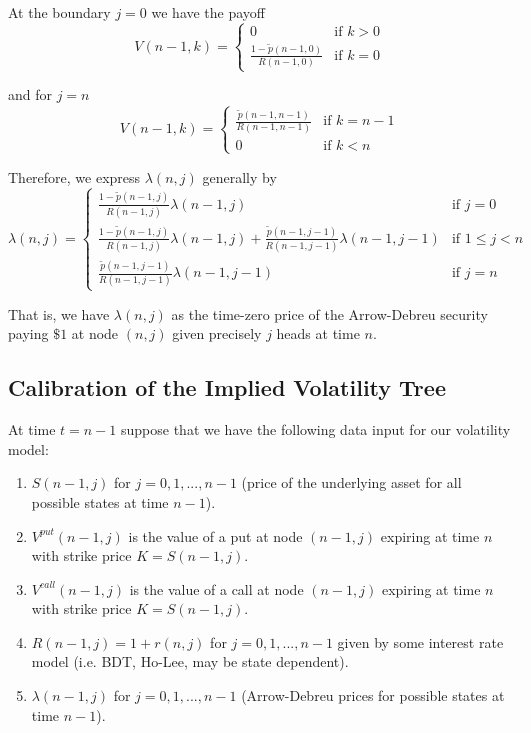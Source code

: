 \documentclass[12pt]{article}
\newlength\tindent
\renewcommand{\indent}{\hspace*{\tindent}}
\begin{document}
At the boundary $j = 0$ we have the payoff
\begin{equation*}
	V(n - 1, k) = 
	\begin{cases}
		0 & \text{if } k > 0 \\
		\frac{ 1 - \tilde{p}(n - 1, 0) }{ R(n - 1, 0) } & \text{if } k = 0
	\end{cases}
\end{equation*}

and for $j = n$
\begin{equation*}
	V(n - 1, k) = 
	\begin{cases}
		\frac{ \tilde{p}(n - 1, n - 1) }{ R(n - 1, n - 1) } & \text{if } k = n - 1 \\
		0 & \text{if } k < n
	\end{cases}
\end{equation*}

Therefore, we express $\lambda(n, j)$ generally by
\begin{equation*}
	\lambda(n,j) =
	\begin{cases}
		\frac{ 1 - \tilde{p}(n - 1, j) }{ R(n - 1, j) } \lambda(n - 1, j) & \text{if } j = 0 \\
		\frac{ 1 - \tilde{p}(n - 1, j) }{ R(n - 1, j) } \lambda(n - 1, j) + \frac{ \tilde{p}(n - 1, j - 1) }{ R(n - 1, j - 1) }\lambda(n - 1, j - 1) & \text{if } 1 \leq j < n \\
		\frac{ \tilde{p}(n - 1, j - 1) }{ R(n - 1, j - 1) } \lambda(n - 1, j - 1) & \text{if } j = n
	\end{cases}
\end{equation*}

\indent That is, we have $\lambda(n,j)$ as the time-zero price of the Arrow-Debreu security paying $\$1$ at node $(n,j)$ given precisely $j$ heads at time $n$.

\subsection{Calibration of the Implied Volatility Tree}

At time $t = n - 1$ suppose that we have the following data input for our volatility model:
\begin{enumerate}[(1)]
	\item $S(n - 1, j)$ for $j = 0,1,...,n - 1$ (price of the underlying asset for all possible states at time $n - 1$).
	\item $V^{put}(n - 1,j)$ is the value of a put at node $(n - 1, j)$ expiring at time $n$ with strike price $K = S(n - 1, j)$.
	\item $V^{call}(n - 1,j)$ is the value of a call at node $(n - 1, j)$ expiring at time $n$ with strike price $K = S(n - 1, j)$. 
	\item $R(n - 1, j) = 1 + r(n,j)$ for $j = 0,1,...,n - 1$ given by some interest rate model (i.e. BDT, Ho-Lee, may be state dependent). 
	\item $\lambda(n - 1, j)$ for $j = 0,1,...,n - 1$ (Arrow-Debreu prices for possible states at time $n - 1$).
\end{enumerate}
\end{document}
